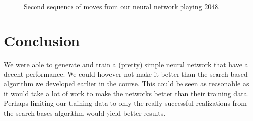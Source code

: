 \documentclass[11pt,a4paper]{article}
\begin{document}
\begin{figure}[h!]
\begin{subfigure}[b]{0.45\textwidth}
    \end{subfigure}
    \caption{Second sequence of moves from our neural network playing 2048.}
    \label{fig:second_seq}
\end{figure}

\section*{Conclusion}
We were able to generate and train a (pretty) simple neural network that have a decent performance. We could however not make it better than the search-based algorithm we developed earlier in the course. This could be seen as reasonable as it would take a lot of work to make the networks better than their training data. Perhaps limiting our training data to only the really successful realizations from the search-bases algorithm would yield better results.
\end{document}
